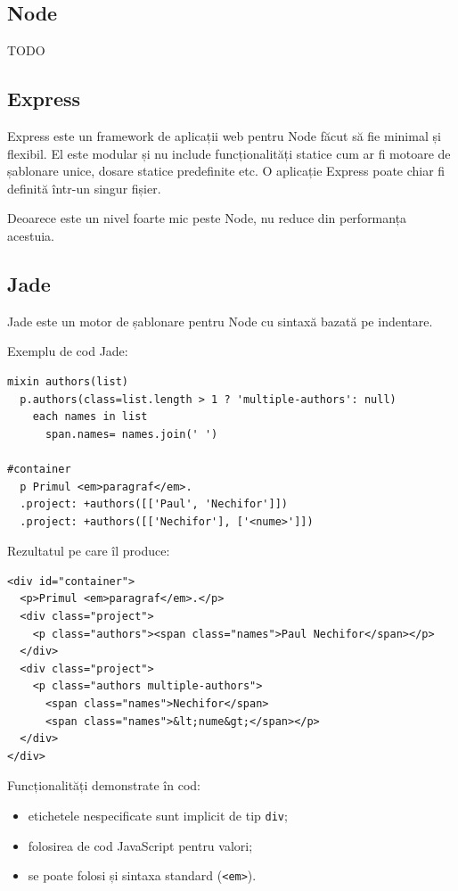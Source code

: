 \documentclass[a4wide,12pt]{report}
\newcommand{\eng}[1]{{#1}} %
\newcommand{\cod}[1]{\texttt{#1}}
\newcommand{\acr}[1]{{\textsmaller[1]{\textsc{#1}}}} %
\newcommand{\idee}[1]{{\color{red} #1}}
\begin{document}
\subsection{Node}

\idee{TODO}

\subsection{Express}

Express este un \eng{framework} de aplicații web pentru Node făcut să fie
minimal și flexibil. El este modular și nu include funcționalități statice cum
ar fi motoare de șablonare unice, dosare statice predefinite etc. O aplicație
Express poate chiar fi definită într-un singur fișier.

Deoarece este un nivel foarte mic peste Node, nu reduce din performanța
acestuia.

\subsection{Jade}

Jade este un motor de șablonare pentru Node cu sintaxă bazată pe indentare.

Exemplu de cod Jade:

\begin{verbatim}
mixin authors(list)
  p.authors(class=list.length > 1 ? 'multiple-authors': null)
    each names in list
      span.names= names.join(' ')

#container
  p Primul <em>paragraf</em>.
  .project: +authors([['Paul', 'Nechifor']])
  .project: +authors([['Nechifor'], ['<nume>']])
\end{verbatim}

Rezultatul pe care îl produce:

\begin{verbatim}
<div id="container">
  <p>Primul <em>paragraf</em>.</p>
  <div class="project">
    <p class="authors"><span class="names">Paul Nechifor</span></p>
  </div>
  <div class="project">
    <p class="authors multiple-authors">
      <span class="names">Nechifor</span>
      <span class="names">&lt;nume&gt;</span></p>
  </div>
</div>
\end{verbatim}

Funcționalități demonstrate în cod:

\begin{itemize}

\item etichetele nespecificate sunt implicit de tip \cod{div};

\item folosirea de cod JavaScript pentru valori;

\item se poate folosi și sintaxa \acr{HTML} standard (\cod{<em>}).

\end{itemize}
\end{document}
